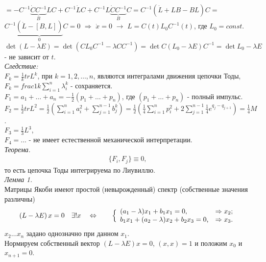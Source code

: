\documentclass[a4paper,12pt]{article}
\theoremstyle{definition}
\theoremstyle{definition}
\theoremstyle{definition}
\newcommand{\bear}[1]{\begin{eqnarray}\label{#1}}
\newcommand{\ear}{\end{eqnarray}}
\begin{document}
$= -C^{-1}\underbrace{\dot{C}C^{-1}}_{B}LC + C^{-1}\dot{L}C + C^{-1}L\underbrace{\dot{C}C^{-1}}_{B}C = C^{-1}\left(\dot{L} + LB -BL\right)C = $\\
$C^{-1}\underbrace{\left(\dot{L} - [B,L]\right)}_{0}C = 0$ $\Rightarrow$ $\dot{x} = 0$ $\rightarrow$ $L = C(t)L_{0}C^{-1}(t)$, где $L_{0} = const$.\\
\[\det{(L - \lambda E)} = \det{\left(CL_{0}C^{-1} - \lambda C C^{-1}\right)} = \det{C(L_{0} - \lambda E)C^{-1}} = \det{L_{0} - \lambda E} \]
- не зависит от  $t$.\\


\textit{Следствие:}\\


$F_{k} = \frac{1}{k} tr{L}^{k}$, при $k=1,2, \ldots, n$, являются интегралами движения цепочки Тоды,\\
$F_{k} = \displaystyle{frac{1}{k}\sum^{n}_{i=1}\lambda^{k}_{i}}$ - сохраняется.\\
$F_{1} = a_{1} + \ldots + a_{n} = -\displaystyle\frac12 (p_{1} + \ldots + p_{n})$, где $(p_{1} + \ldots + p_{n})$ - полный импульс.\\
$F_{2} = \frac12 tr L^{2} = \displaystyle{\frac12 \left(\sum^{n}_{i=1} a^{2}_{i} + \sum^{n-1}_{j=1}b^{k}_{j}\right)} = \displaystyle{\frac12 \left( \frac14 \sum^{n}_{i=1}p^{2}_{i} + 2 \sum^{n-1}_{j=1}\frac14 e^{q_{j} - q_{j+1}}\right)} = \frac14 M$.\\
$F_{3} = \frac13 L^{3}$,\\
$F_{4} = \ldots $  - не имеет естественной механической интерпретации.\\

\textit{Теорема.}
\bear{inv_int}
\{F_{i},F_{j}\}\equiv 0,
\ear
то есть цепочка Тоды интегрируема по Лиувиллю.\\

\textit{Лемма 1.}\\

Матрицы Якоби имеют простой (невырожденный) спектр (собственные значения различны)
\[\left(L - \lambda E\right)x = 0 \quad \exists !x \quad \Leftrightarrow \qquad\Bigl\{
                                                                    \begin{array}{ll}
                                                                      (a_{1} -\lambda)x_{1} + b_{1}x_{1} = 0 \textrm{,} & \Rightarrow x_{2}\textrm{;} \\
                                                                      b_{1}x_{1} + (a_{2} - \lambda)x_{2} + b_{2}x_{3} = 0 \textrm{,} & \Rightarrow x_{3}\textrm{.}
                                                                    \end{array} 
\]
$x_{2}\ldots x_{n}$ задано однозначно при данном $x_{1}$.\\
Нормируем собственный вектор $(L - \lambda E)x = 0$, $(x,x) = 1$ и положим $x_{0}$ и $x_{n+1} = 0$.\\
\end{document}
